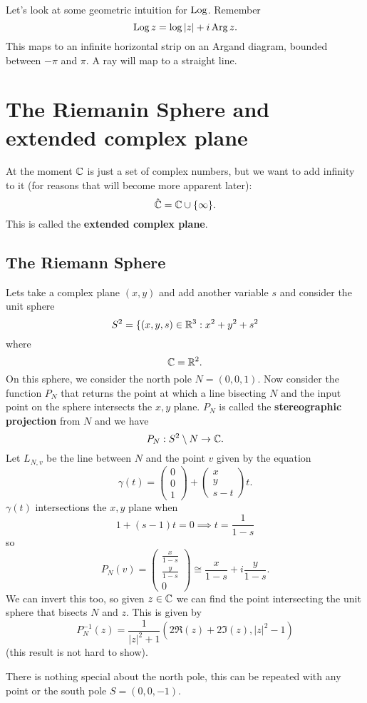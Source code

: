 
Let's look at some geometric intuition for $\operatorname{Log}$. Remember 
\[ \operatorname{Log}{z} = \log{\lvert z \rvert} + i \operatorname{Arg}{z}. \]
This maps to an infinite horizontal strip on an Argand diagram, bounded between $-\pi$ and $\pi$. A ray will map to a straight line.

\section{The Riemanin Sphere and extended complex plane}

At the moment $\mathbb{C}$ is just a set of complex numbers, but we want to add infinity to it (for reasons that will become more apparent later):
\[ \hat {\mathbb{C}} = \mathbb{C} \cup \{ \infty \}. \]
This is called the \textbf{extended complex plane}. 

\subsection*{The Riemann Sphere}

Lets take a complex plane $(x, y)$ and add another variable $s$ and consider the unit sphere
\[ S^2 = \{ (x, y, s) \in \mathbb{R}^3 : x^2 + y^2 + s^2 \] 
where 
\[ \mathbb{C} = \mathbb{R}^2. \] 
On this sphere, we consider the north pole $N = (0, 0, 1)$. Now consider the function $P_N$ that returns the point at which a line bisecting $N$ and the input point on the sphere intersects the $x, y$ plane. $P_N$ is called the \textbf{stereographic projection} from $N$ and we have 
\[ P_N : S^2 \setminus N \to \mathbb{C}. \] 
Let $L_{N, v}$ be the line between $N$ and the point $v$ given by the equation
\[ \gamma(t) = \begin{pmatrix} 0 \\ 0 \\ 1 \end{pmatrix} + \begin{pmatrix} x \\ y \\ s - t \end{pmatrix} t. \]
$\gamma(t)$ intersections the $x, y$ plane when
\[  1 + (s - 1) t = 0 \implies t = \frac{1}{1 - s} \]
so
\[ P_N(v) = \begin{pmatrix} \frac{x}{1 - s} \\ \frac{y}{1 - s} \\ 0 \end{pmatrix} \cong \frac{x}{1 - s} + i \frac{y}{1 - s}. \] We can invert this too, so given $z \in \mathbb{C}$ we can find the point intersecting the unit sphere that bisects $N$ and $z$. This is given by
\[ P^{-1}_N(z) = \frac{1}{\lvert z \rvert^2 + 1} (2\Re{(z)} + 2\Im{(z)}, \lvert z \rvert^2 - 1) \] (this result is not hard to show).
\begin{remark}
    There is nothing special about the north pole, this can be repeated with any point or the south pole $S = (0, 0, -1)$. 
\end{remark}

